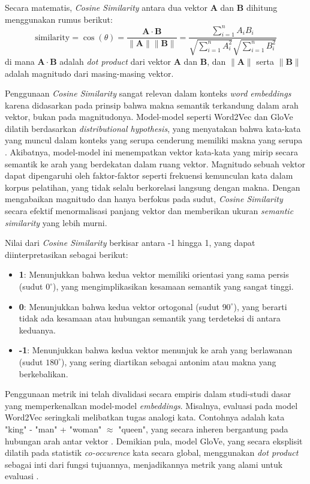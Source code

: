 Secara matematis, \textit{Cosine Similarity} antara dua vektor $\mathbf{A}$ dan $\mathbf{B}$ dihitung menggunakan rumus berikut:
$$\text{similarity} = \cos(\theta) = \frac{\mathbf{A} \cdot \mathbf{B}}{\|\mathbf{A}\| \|\mathbf{B}\|} = \frac{\sum_{i=1}^{n} A_i B_i}{\sqrt{\sum_{i=1}^{n} A_i^2} \sqrt{\sum_{i=1}^{n} B_i^2}}$$
di mana $\mathbf{A} \cdot \mathbf{B}$ adalah \textit{dot product} dari vektor $\mathbf{A}$ dan $\mathbf{B}$, dan $\|\mathbf{A}\|$ serta $\|\mathbf{B}\|$ adalah magnitudo dari masing-masing vektor.

Penggunaan \textit{Cosine Similarity} sangat relevan dalam konteks \textit{word embeddings} karena didasarkan pada prinsip bahwa makna semantik terkandung dalam arah vektor, bukan pada magnitudonya. Model-model seperti Word2Vec dan GloVe dilatih berdasarkan \textit{distributional hypothesis}, yang menyatakan bahwa kata-kata yang muncul dalam konteks yang serupa cenderung memiliki makna yang serupa \parencite{firth1957synopsis}. Akibatnya, model-model ini menempatkan vektor kata-kata yang mirip secara semantik ke arah yang berdekatan dalam ruang vektor. Magnitudo sebuah vektor dapat dipengaruhi oleh faktor-faktor seperti frekuensi kemunculan kata dalam korpus pelatihan, yang tidak selalu berkorelasi langsung dengan makna. Dengan mengabaikan magnitudo dan hanya berfokus pada sudut, \textit{Cosine Similarity} secara efektif menormalisasi panjang vektor dan memberikan ukuran \textit{semantic similarity} yang lebih murni.

Nilai dari \textit{Cosine Similarity} berkisar antara -1 hingga 1, yang dapat diinterpretasikan sebagai berikut:
\begin{itemize}
    \item \textbf{1}: Menunjukkan bahwa kedua vektor memiliki orientasi yang sama persis (sudut $0^\circ$), yang mengimplikasikan kesamaan semantik yang sangat tinggi.
    \item \textbf{0}: Menunjukkan bahwa kedua vektor ortogonal (sudut $90^\circ$), yang berarti tidak ada kesamaan atau hubungan semantik yang terdeteksi di antara keduanya.
    \item \textbf{-1}: Menunjukkan bahwa kedua vektor menunjuk ke arah yang berlawanan (sudut $180^\circ$), yang sering diartikan sebagai antonim atau makna yang berkebalikan.
\end{itemize}

Penggunaan metrik ini telah divalidasi secara empiris dalam studi-studi dasar yang memperkenalkan model-model \textit{embeddings}. Misalnya, evaluasi pada model Word2Vec seringkali melibatkan tugas analogi kata. Contohnya adalah kata "king" - "man" + "woman" $\approx$ "queen", yang secara inheren bergantung pada hubungan arah antar vektor \parencite{mikolov2013efficient}. Demikian pula, model GloVe, yang secara eksplisit dilatih pada statistik \textit{co-occurence} kata secara global, menggunakan \textit{dot product} sebagai inti dari fungsi tujuannya, menjadikannya metrik yang alami untuk evaluasi \parencite{pennington2014glove}.